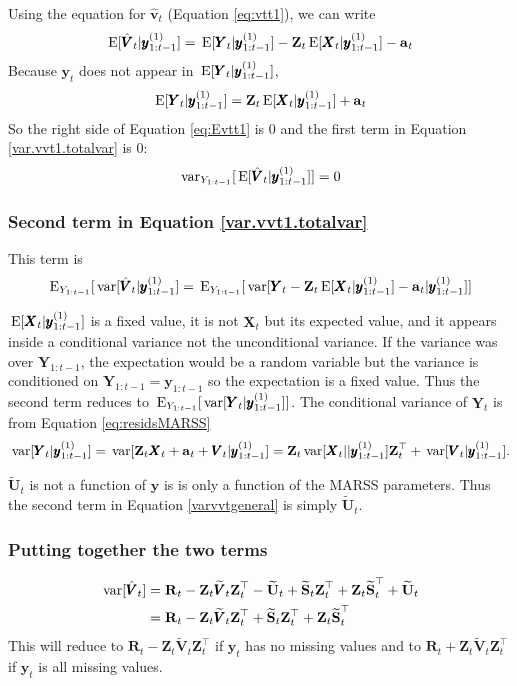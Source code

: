 \documentclass[]{article}
\def\XI{\mbox{\boldmath $\Xi$}}
\def\E{\,\textup{\textrm{E}}}
\def\RR{\mbox{$\mathbf R$}}	 \def\rr{\mbox{$\mathbf r$}} \def\Rb{\mbox{$\mathbf H$}}	\def\Rm{\mathbb{R}}
\def\Ss{\mbox{$\mathbf S$}}
\def\UU{\mbox{$\mathbf U$}}	\def\uu{\mbox{$\mathbf u$}}
\def\VV{\mbox{$\pmb{V}$}}	\def\vv{\mbox{$\pmb{v}$}}
\def\XX{\mbox{$\pmb{X}$}}	\def\xx{\mbox{$\pmb{x}$}}
\def\YY{\mbox{$\pmb{Y}$}}	\def\yy{\mbox{$\pmb{y}$}}
\def\ZZ{\mbox{$\mathbf Z$}}	\def\zz{\mbox{$\mathbf z$}}	\def\Zb{\mbox{$\mathbf M$}} \def\Za{\mbox{$\mathbf N$}} \def\Zm{\XI}
\def\var{\,\textup{\textrm{var}}}
\def\hatVt{\widetilde{\VV}_t}
\def\hatUt{\widetilde{\UU}_t}
\def\hatSt{\widetilde{\Ss}_t}
\begin{document}
Using the equation for $\hat{\vv}_t$ (Equation \ref{eq:vtt1}), we can write
\begin{equation}\label{eq:Evtt1}
\E[\hat{\VV}_t|\yy^{(1)}_{1:t-1}]=\E[\YY_t|\yy^{(1)}_{1:t-1}] - \ZZ_t\E[\XX_t|\yy^{(1)}_{1:t-1}] - \aa_t
\end{equation}
Because $\yy_t$ does not appear in $\E[\YY_t|\yy^{(1)}_{1:t-1}]$,
\begin{equation}
\E[\YY_t|\yy^{(1)}_{1:t-1}] = \ZZ_t\E[\XX_t|\yy^{(1)}_{1:t-1}] + \aa_t
\end{equation}
So the right side of Equation \ref{eq:Evtt1} is 0 and the first term in Equation \ref{var.vvt1.totalvar} is 0:
\begin{equation}
\var_{Y_{1:t-1}}[\E[\hat{\VV}_t|\yy^{(1)}_{1:t-1}]] = 0
\end{equation}

\subsubsection{Second term in Equation \ref{var.vvt1.totalvar}}

This term is 
\begin{equation}
\E_{Y_{1:t-1}}[\var[\hat{\VV}_t|\yy^{(1)}_{1:t-1}] =
\E_{Y_{1:t-1}}[\var[\YY_t-\ZZ_t\E[\XX_t|\yy^{(1)}_{1:t-1}]-\aa_t|\yy^{(1)}_{1:t-1}]]
\end{equation}

$\E[\XX_t|\yy^{(1)}_{1:t-1}]$ is a fixed value, it is not $\XX_t$ but its expected value, and it appears inside a conditional variance not the unconditional variance. If the variance was over $\YY_{1:t-1}$, the expectation would be a random variable but the variance is conditioned on $\YY_{1:t-1}=\yy_{1:t-1}$ so the expectation is a fixed value.  Thus the second term reduces to $\E_{Y_{1:t-1}}[\var[\YY_t|\yy^{(1)}_{1:t-1}]]$. The conditional variance of $\YY_t$ is from Equation \ref{eq:residsMARSS}
\begin{equation}
\var[\YY_t|\yy^{(1)}_{1:t-1}] = \var[\ZZ_t \XX_t + \aa_t + \VV_t|\yy^{(1)}_{1:t-1}] \\
= \ZZ_t \var[\XX_t||\yy^{(1)}_{1:t-1}] \ZZ_t^\top + \var[\VV_t|\yy^{(1)}_{1:t-1}].
\end{equation}


$\hatUt$ is not a function of $\yy$ is is only a function of the MARSS parameters.  Thus the second term in Equation \ref{varvvtgeneral} is simply $\hatUt$.

\subsubsection{Putting together the two terms}
\begin{equation}
\begin{split}
\var[\hat{\VV}_t] &= \RR_t - \ZZ_t \hatVt \ZZ_t^\top - \hatUt + \hatSt\ZZ_t^\top + \ZZ_t\hatSt^\top + \hatUt\\
&= \RR_t - \ZZ_t \hatVt \ZZ_t^\top + \hatSt\ZZ_t^\top + \ZZ_t\hatSt^\top
\end{split}
\end{equation}
This will reduce to $\RR_t - \ZZ_t \hatVt \ZZ_t^\top$ if $\yy_t$ has no missing values and to $\RR_t + \ZZ_t \hatVt \ZZ_t^\top$ if $\yy_t$ is all missing values.
\end{document}
